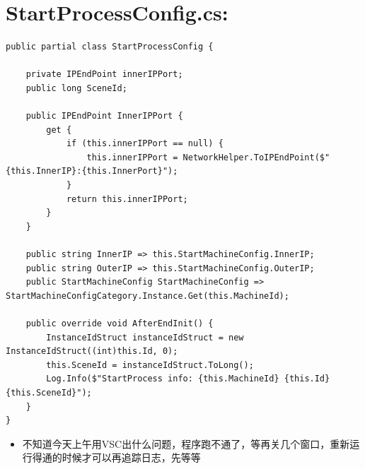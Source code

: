 \documentclass[9pt, b5paper]{article}
\begin{document}
\section{StartProcessConfig.cs:}
\label{sec-18}
\begin{verbatim}
public partial class StartProcessConfig {

    private IPEndPoint innerIPPort;
    public long SceneId;

    public IPEndPoint InnerIPPort {
        get {
            if (this.innerIPPort == null) {
                this.innerIPPort = NetworkHelper.ToIPEndPoint($"{this.InnerIP}:{this.InnerPort}");
            }
            return this.innerIPPort;
        }
    }

    public string InnerIP => this.StartMachineConfig.InnerIP;
    public string OuterIP => this.StartMachineConfig.OuterIP;
    public StartMachineConfig StartMachineConfig => StartMachineConfigCategory.Instance.Get(this.MachineId);

    public override void AfterEndInit() {
        InstanceIdStruct instanceIdStruct = new InstanceIdStruct((int)this.Id, 0);
        this.SceneId = instanceIdStruct.ToLong();
        Log.Info($"StartProcess info: {this.MachineId} {this.Id} {this.SceneId}");
    }
}
\end{verbatim}
\begin{itemize}
\item 不知道今天上午用VSC出什么问题，程序跑不通了，等再关几个窗口，重新运行得通的时候才可以再追踪日志，先等等
\end{itemize}
\end{document}
